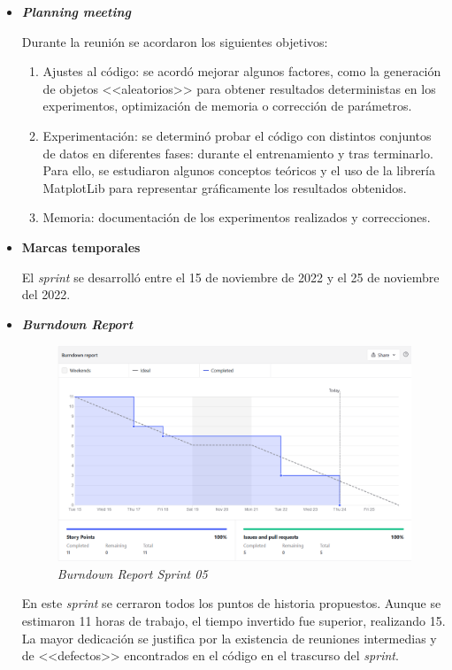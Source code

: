 \begin{itemize}
	\item \textbf{\textit{Planning meeting}}
	
	Durante la reunión se acordaron los siguientes objetivos:
	
	\begin{enumerate}
		\item Ajustes al código: se acordó mejorar algunos factores, como la generación de objetos <<aleatorios>> para obtener resultados deterministas en los experimentos, optimización de memoria o corrección de parámetros.
		\item Experimentación: se determinó probar el código con distintos conjuntos de datos en diferentes fases: durante el entrenamiento y tras terminarlo. Para ello, se estudiaron algunos conceptos teóricos y el uso de la librería MatplotLib para representar gráficamente los resultados obtenidos.
		\item Memoria: documentación de los experimentos realizados y correcciones.
	\end{enumerate}

	\item \textbf{Marcas temporales}		
	
	El \textit{sprint} se desarrolló entre el 15 de noviembre de 2022 y el 25 de noviembre del 2022.
	
	\item \textbf{\textit{Burndown Report}}
		\begin{figure}[h]
		\caption{\textit{Burndown Report Sprint 05}}
		\centering
		\includegraphics[width=\textwidth]{../img/anexos/bdr/s05_bdr}
	\end{figure}
	
	En este \textit{sprint} se cerraron todos los puntos de historia propuestos. Aunque se estimaron 11 horas de trabajo, el tiempo invertido fue superior, realizando 15. La mayor dedicación se justifica por la existencia de reuniones intermedias y de <<defectos>> encontrados en el código en el trascurso del \textit{sprint}.
	

\end{itemize}
